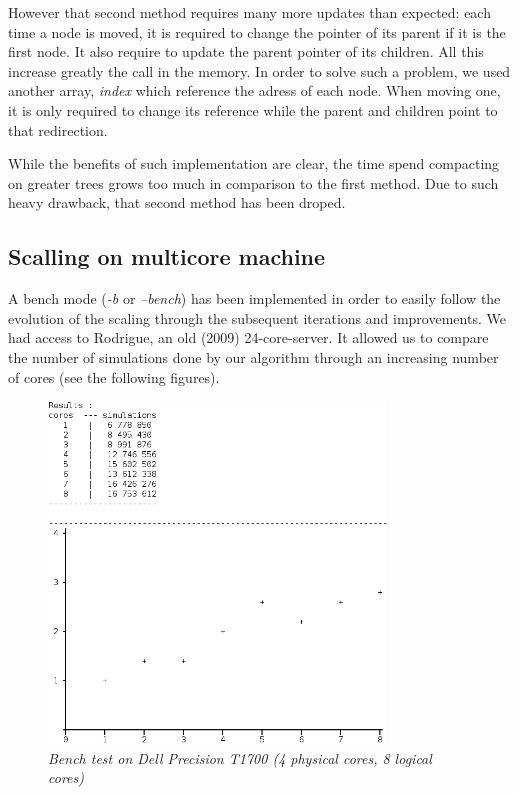 However that second method requires many more updates than expected: 
each time a node is moved, it is required to change the pointer of its parent if it is the first node. It also require to update the parent pointer of its children. All this increase greatly the call in the memory. In order to solve such a problem, we used another array, \textit{index} which reference the adress of each node. When moving one, it is only required to change its reference while the parent and children point to that redirection.

While the benefits of such implementation are clear, the time spend compacting on greater trees grows too much in comparison to the first method. Due to such heavy drawback, that second method has been droped.

\subsection{Scalling on multicore machine}

A bench mode (\textit{-b} or \textit{--bench}) has been implemented in order to easily follow the evolution of the scaling through the subsequent iterations and improvements. We had access to Rodrigue, an old (2009) 24-core-server. It allowed us to compare the number of simulations done by our algorithm through an increasing number of cores (see the following figures).

\begin{figure}[H] 
\centerline{\includegraphics[width=0.8\textwidth]{Optimisations/bench_T1700.png}}
\caption{\label{fig:Defrag}\textit{Bench test on Dell Precision T1700 (4 physical cores, 8 logical cores)}}
\end{figure}

